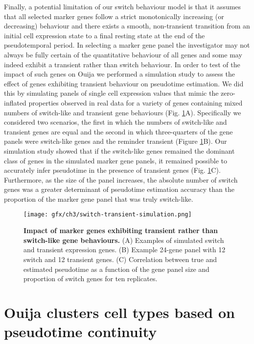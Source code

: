 Finally, a potential limitation of our switch behaviour model is that it assumes that all selected marker genes follow a strict monotonically increasing (or decreasing) behaviour and there exists a smooth, non-transient transition from an initial cell expression state to a final resting state at the end of the pseudotemporal period. In selecting a marker gene panel the investigator may not always be fully certain of the quantitative behaviour of all genes and some may indeed exhibit a transient rather than switch behaviour. In order to test of the impact of such genes on Ouija we performed a simulation study to assess the effect of genes exhibiting transient behaviour on pseudotime estimation. We did this by simulating panels of single cell expression values that mimic the zero-inflated properties observed in real data for a variety of genes containing mixed numbers of switch-like and transient gene behaviours (Fig. \ref{fig:switch-transient-simulation}A). Specifically we considered two scenarios, the first in which the numbers of switch-like and transient genes are equal and the second in which three-quarters of the gene panels were switch-like genes and the reminder transient (Figure \ref{fig:switch-transient-simulation}B). Our simulation study showed that if the switch-like genes remained the dominant class of genes in the simulated marker gene panels, it remained possible to accurately infer pseudotime in the presence of transient genes (Fig. \ref{fig:switch-transient-simulation}C). Furthermore, as the size of the panel increases, the absolute number of switch genes was a greater determinant of pseudotime estimation accuracy than the proportion of the marker gene panel that was truly switch-like.

\begin{figure}
	\texttt{[image: gfx/ch3/switch-transient-simulation.png]}
	\caption{{\bf Impact of marker genes exhibiting transient rather than switch-like gene behaviours.} (A) Examples of simulated switch and transient expression genes. (B) Example 24-gene panel with 12 switch and 12 transient genes. (C) Correlation between true and estimated pseudotime as a function of the gene panel size and proportion of switch genes for ten replicates.}
	\label{fig:switch-transient-simulation}
\end{figure}


\section{Ouija clusters cell types based on pseudotime continuity}

